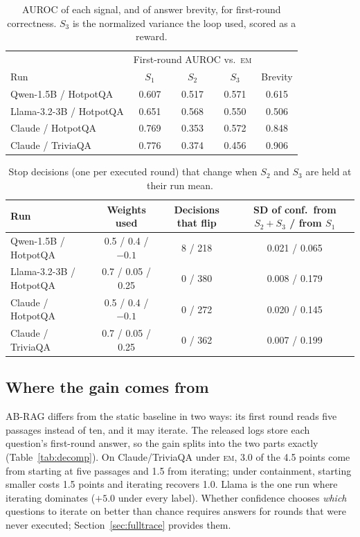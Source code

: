 \documentclass[11pt]{article}
\newcommand{\EM}{\textsc{em}}
\begin{document}
\begin{table}[t]
\centering
\small
\begin{tabular}{lcccc}
\toprule
& \multicolumn{3}{c}{First-round AUROC vs.\ \EM{}} & \\
Run & $S_1$ & $S_2$ & $S_3$ & Brevity \\
\midrule
Qwen-1.5B / HotpotQA & 0.607 & 0.517 & 0.571 & 0.615 \\
Llama-3.2-3B / HotpotQA & 0.651 & 0.568 & 0.550 & 0.506 \\
Claude / HotpotQA & 0.769 & 0.353 & 0.572 & 0.848 \\
Claude / TriviaQA & 0.776 & 0.374 & 0.456 & 0.906 \\
\bottomrule
\end{tabular}
\caption{AUROC of each signal, and of answer brevity, for first-round correctness. $S_3$ is the normalized variance the loop used, scored as a reward.}
\label{tab:auroc}
\end{table}

\begin{table}[t]
\centering
\small
\begin{tabular}{lccc}
\toprule
Run & Weights used & Decisions that flip & SD of conf.\ from $S_2{+}S_3$ / from $S_1$ \\
\midrule
Qwen-1.5B / HotpotQA & 0.5 / 0.4 / $-0.1$ & 8 / 218 & 0.021 / 0.065 \\
Llama-3.2-3B / HotpotQA & 0.7 / 0.05 / 0.25 & 0 / 380 & 0.008 / 0.179 \\
Claude / HotpotQA & 0.5 / 0.4 / $-0.1$ & 0 / 272 & 0.020 / 0.145 \\
Claude / TriviaQA & 0.7 / 0.05 / 0.25 & 0 / 362 & 0.007 / 0.199 \\
\bottomrule
\end{tabular}
\caption{Stop decisions (one per executed round) that change when $S_2$ and $S_3$ are held at their run mean.}
\label{tab:n2}
\end{table}

\subsection{Where the gain comes from}
\label{sec:decomp}

AB-RAG differs from the static baseline in two ways: its first round reads five passages instead of ten, and it may iterate. The released logs store each question's first-round answer, so the gain splits into the two parts exactly (Table~\ref{tab:decomp}). On Claude/TriviaQA under \EM{}, 3.0 of the 4.5 points come from starting at five passages and 1.5 from iterating; under containment, starting smaller costs 1.5 points and iterating recovers 1.0. Llama is the one run where iterating dominates ($+5.0$ under every label). Whether confidence chooses \emph{which} questions to iterate on better than chance requires answers for rounds that were never executed; Section~\ref{sec:fulltrace} provides them.
\end{document}
